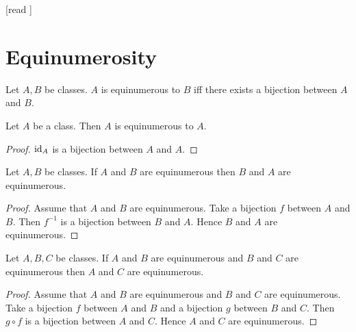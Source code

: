 \documentclass[10pt]{article}
\begin{document}
  \begin{imports}
    \begin{forthel}
      [read ]
    \end{forthel}
  \end{imports}


  \section*{Equinumerosity}

  \begin{forthel}
    \begin{definition}[id=FOUNDATIONS_13_4578620297183232,printid]
      Let $A, B$ be classes.
      $A$ is equinumerous to $B$ iff there exists a bijection between $A$ and $B$.
    \end{definition}
  \end{forthel}

  \begin{forthel}
    \begin{proposition}[id=FOUNDATIONS_13_3703161885818880,printid]
      Let $A$ be a class.
      Then $A$ is equinumerous to $A$.
    \end{proposition}
    \begin{proof}
      $\textrm{id}_{A}$ is a bijection between $A$ and $A$.
    \end{proof}
  \end{forthel}

  \begin{forthel}
    \begin{proposition}[id=FOUNDATIONS_13_8050301789536256,printid]
      Let $A, B$ be classes.
      If $A$ and $B$ are equinumerous then $B$ and $A$ are equinumerous.
    \end{proposition}
    \begin{proof}
      Assume that $A$ and $B$ are equinumerous.
      Take a bijection $f$ between $A$ and $B$.
      Then $f^{-1}$ is a bijection between $B$ and $A$.
      Hence $B$ and $A$ are equinumerous.
    \end{proof}
  \end{forthel}

  \begin{forthel}
    \begin{proposition}[id=FOUNDATIONS_13_3609912414306304,printid]
      Let $A, B, C$ be classes.
      If $A$ and $B$ are equinumerous and $B$ and $C$ are equinumerous then $A$ and $C$ are equinumerous.
    \end{proposition}
    \begin{proof}
      Assume that $A$ and $B$ are equinumerous and $B$ and $C$ are equinumerous.
      Take a bijection $f$ between $A$ and $B$ and a bijection $g$ between $B$ and $C$.
      Then $g \circ f$ is a bijection between $A$ and $C$.
      Hence $A$ and $C$ are equinumerous.
    \end{proof}
  \end{forthel}
\end{document}
